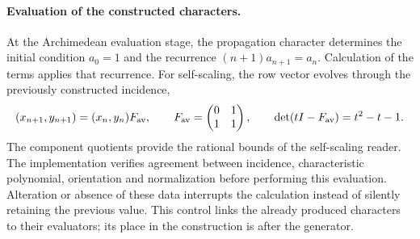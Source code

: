 \paragraph{Evaluation of the constructed characters.}
At the Archimedean evaluation stage, the propagation character
determines the initial condition \(a_0=1\) and the recurrence
\((n+1)a_{n+1}=a_n\). Calculation of the terms applies that recurrence.
For self-scaling, the row vector evolves through the previously constructed
incidence,
\[
 (x_{n+1},y_{n+1})=(x_n,y_n)F_{\rm av},
 \qquad
 F_{\rm av}=\begin{pmatrix}0&1\\1&1\end{pmatrix},
 \qquad
 \det(tI-F_{\rm av})=t^2-t-1.
\]
The component quotients provide the rational bounds of the
self-scaling reader. The implementation verifies agreement between
incidence, characteristic polynomial, orientation and normalization before
performing this evaluation. Alteration or absence of these data
interrupts the calculation instead of silently retaining the previous
value. This control links the already produced characters to their
evaluators; its place in the construction is after the generator.
